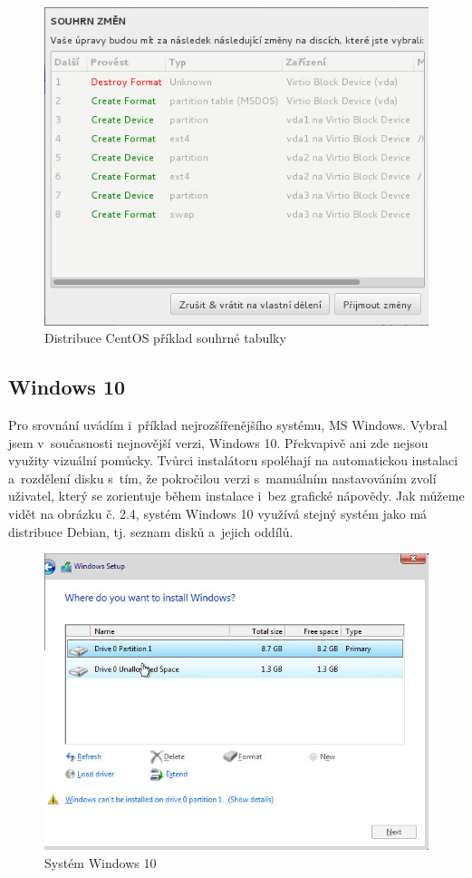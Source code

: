 \documentclass[printed,color,table,oneside,nolot,nolof]{fithesis}
\begin{document}
\begin{figure}[h!]
	\label{fig:centos2}
	\caption{Distribuce CentOS příklad souhrné tabulky}
	\centering
	\includegraphics[width=.8\columnwidth]{pictures/centos3.jpg}
\end{figure}

\pagebreak
\subsection{Windows 10}

	Pro srovnání uvádím i~příklad nejrozšířenějšího systému, MS Windows. Vybral jsem v~současnosti nejnovější verzi, Windows 10. Překvapivě ani zde nejsou využity vizuální pomůcky\cite{windows}.
	Tvůrci instalátoru spoléhají na automatickou instalaci a~rozdělení disku s~tím, že pokročilou verzi s~manuálním nastavováním zvolí uživatel, který se zorientuje během instalace i~bez grafické nápovědy. 
	Jak můžeme vidět na obrázku č. 2.4, systém Windows 10 využívá stejný systém jako má distribuce Debian, tj. seznam disků a~jejich oddílů.

\begin{figure}[h!]
	\label{fig:win}
	\caption{Systém Windows 10}
	\centering
	\includegraphics[width=.8\columnwidth]{pictures/win1.jpg}
\end{figure}
\end{document}
